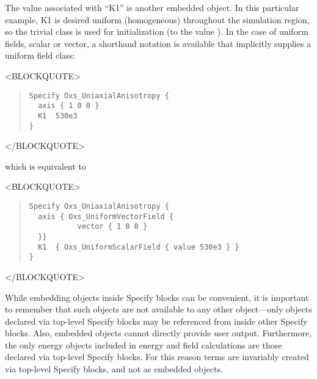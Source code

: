 \fussy
The value associated with ``K1'' is another embedded 
object.  In this particular example, K1 is desired uniform (homogeneous)
throughout the simulation region, so the trivial
 class is used for initialization (to the value
).  In the case of
uniform fields, scalar or vector, a shorthand notation is available that
implicitly supplies a uniform  field class:
\begin{rawhtml}
<BLOCKQUOTE>
\end{rawhtml}
\begin{quote}
\begin{verbatim}
Specify Oxs_UniaxialAnisotropy {
  axis { 1 0 0 }
  K1  530e3
}
\end{verbatim}
\end{quote}
\begin{rawhtml}
</BLOCKQUOTE>
\end{rawhtml}
which is equivalent to
\begin{rawhtml}
<BLOCKQUOTE>
\end{rawhtml}
\begin{quote}
\begin{verbatim}
Specify Oxs_UniaxialAnisotropy {
  axis { Oxs_UniformVectorField {
           vector { 1 0 0 }
  }}
  K1  { Oxs_UniformScalarField { value 530e3 } }
}
\end{verbatim}
\end{quote}
\begin{rawhtml}
</BLOCKQUOTE>
\end{rawhtml}

While embedding  objects inside Specify blocks can be
convenient, it is important to remember that such objects are not
available to any other  object---only objects declared via
top-level Specify blocks may be referenced from inside other
Specify blocks.  Also, embedded  objects cannot
directly provide user output.  Furthermore, the only 
energy objects included in energy and field calculations are those
declared via top-level Specify blocks.  For this reason
 terms are invariably created via top-level Specify
blocks, and not as embedded objects.

